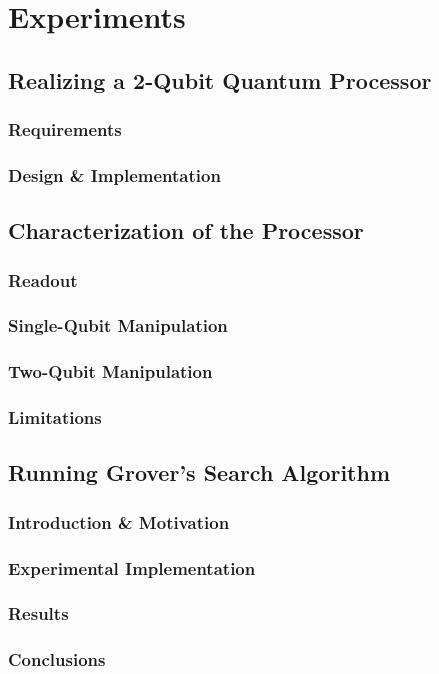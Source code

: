 \chapter{Experiments}

\section{Realizing a 2-Qubit Quantum Processor}

\subsection{Requirements}

\subsection{Design \& Implementation}

\section{Characterization of the Processor}

\subsection{Readout}

\subsection{Single-Qubit Manipulation}

\subsection{Two-Qubit Manipulation}

\subsection{Limitations}

\section{Running Grover's Search Algorithm}

\subsection{Introduction \& Motivation}

\subsection{Experimental Implementation}

\subsection{Results}

\subsection{Conclusions}
